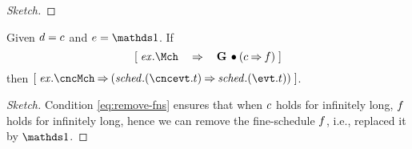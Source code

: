 \begin{proof}[Sketch]
\end{proof}

\begin{Theorem}
\label{thm:remove-fns}
  Given $d = c$ and $\cncfsched = \one$. If
  \begin{equation}
    \label{eq:remove-fns}
    \ew{\execution.\Mch \WIDE\limp \G \initially (\csched \limp \fsched)}
  \end{equation}
  then $\ew{\execution.\cncMch \limp (\schedule.(\cncevt.t) \limp \schedule.(\evt.t))}$.
\end{Theorem}
\begin{proof}[Sketch]
  Condition \eqref{eq:remove-fns} ensures that when $c$ holds
  for infinitely long, $f$ holds for infinitely long, hence we can remove the
  fine-schedule $f$, i.e., replaced it by $\one$.
\end{proof}
%

%

%

%

